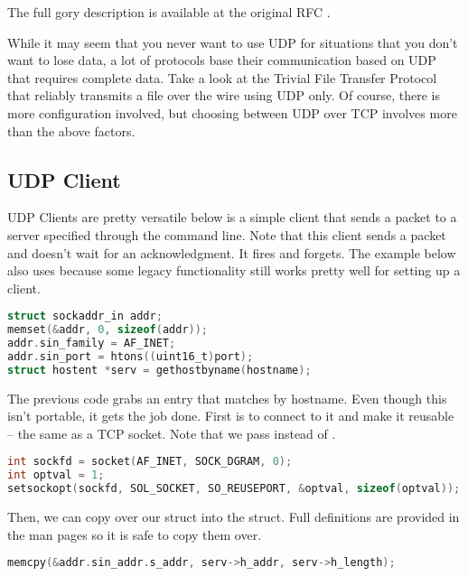 The full gory description is available at the original RFC \cite{rfc768}.

While it may seem that you never want to use UDP for situations that you don't want to lose data, a lot of protocols base their communication based on UDP that requires complete data.
Take a look at the Trivial File Transfer Protocol that reliably transmits a file over the wire using UDP only.
Of course, there is more configuration involved, but choosing between UDP over TCP involves more than the above factors.

\subsection{UDP Client}

UDP Clients are pretty versatile below is a simple client that sends a packet to a server specified through the command line.
Note that this client sends a packet and doesn't wait for an acknowledgment.
It fires and forgets.
The example below also uses  because some legacy functionality still works pretty well for setting up a client.

\begin{lstlisting}[language=C]
struct sockaddr_in addr;
memset(&addr, 0, sizeof(addr));
addr.sin_family = AF_INET;
addr.sin_port = htons((uint16_t)port);
struct hostent *serv = gethostbyname(hostname);
\end{lstlisting}

The previous code grabs an entry  that matches by hostname.
Even though this isn't portable, it gets the job done.
First is to connect to it and make it reusable -- the same as a TCP socket.
Note that we pass  instead of .

\begin{lstlisting}[language=C]
int sockfd = socket(AF_INET, SOCK_DGRAM, 0);
int optval = 1;
setsockopt(sockfd, SOL_SOCKET, SO_REUSEPORT, &optval, sizeof(optval));
\end{lstlisting}

Then, we can copy over our  struct into the  struct.
Full definitions are provided in the man pages so it is safe to copy them over.

\begin{lstlisting}[language=C]
memcpy(&addr.sin_addr.s_addr, serv->h_addr, serv->h_length);
\end{lstlisting}

